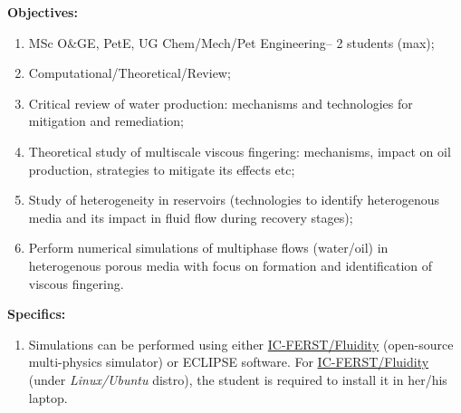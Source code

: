 \documentclass[12pts,a4paper,amsmath,amssymb,floatfix]{article}%
\newcommand{\all}{MSc O$\&$GE, PetE, UG Chem/Mech/Pet Engineering}
\begin{document}
\begin{enumerate}[label=\bfseries Project: \arabic*:]
\noindent
{\bf Objectives:}
\begin{enumerate}
\item \all -- 2 students (max);
\item Computational/Theoretical/Review;
\item Critical review of water production: mechanisms and technologies for mitigation and remediation;
\item Theoretical study of multiscale viscous fingering: mechanisms, impact on oil production, strategies to mitigate its effects etc;
\item Study of heterogeneity in reservoirs (technologies to identify heterogenous media and its impact in fluid flow during recovery stages);
\item Perform numerical simulations of multiphase flows (water/oil) in heterogenous porous media with focus on formation and identification of viscous fingering.  
\end{enumerate}

\noindent
{\bf Specifics:} 
\begin{enumerate}
\item Simulations can be performed using either \href{http://multifluids.github.io/}{IC-FERST/Fluidity} (open-source multi-physics simulator) or ECLIPSE software. For  \href{http://multifluids.github.io/}{IC-FERST/Fluidity} (under {\it Linux/Ubuntu} distro), the student is required to install it in her/his laptop.  
\end{enumerate}



\end{enumerate}
\end{document}
